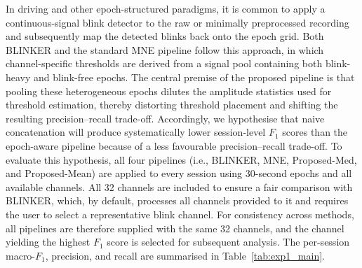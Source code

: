 
In driving and other epoch-structured paradigms, it is common to apply a continuous-signal blink detector to the raw or minimally preprocessed recording and subsequently map the detected blinks back onto the epoch grid. Both BLINKER and the standard MNE pipeline follow this approach, in which channel-specific thresholds are derived from a signal pool containing both blink-heavy and blink-free epochs. The central premise of the proposed pipeline is that pooling these heterogeneous epochs dilutes the amplitude statistics used for threshold estimation, thereby distorting threshold placement and shifting the resulting precision--recall trade-off.
Accordingly, we hypothesise that naive concatenation will produce systematically lower session-level $F_1$ scores than the epoch-aware pipeline because of a less favourable precision--recall trade-off. To evaluate this hypothesis, all four pipelines (i.e., BLINKER, MNE, Proposed-Med, and Proposed-Mean) are applied to every session using 30-second epochs and all available channels. All 32 channels are included to ensure a fair comparison with BLINKER, which, by default, processes all channels provided to it and requires the user to select a representative blink channel. For consistency across methods, all pipelines are therefore supplied with the same 32 channels, and the channel yielding the highest $F_1$ score is selected for subsequent analysis. The per-session macro-$F_1$, precision, and recall are summarised in Table~\ref{tab:exp1_main}.


